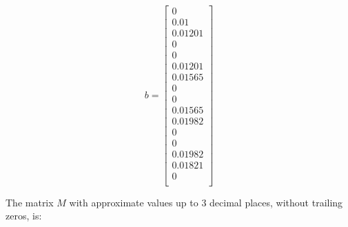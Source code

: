 \documentclass{article}
\begin{document}
\[
    b = \begin{bmatrix}
        0       \\
        0.01    \\
        0.01201 \\
        0       \\
        0       \\
        0.01201 \\
        0.01565 \\
        0       \\
        0       \\
        0.01565 \\
        0.01982 \\
        0       \\
        0       \\
        0.01982 \\
        0.01821 \\
        0       \\
    \end{bmatrix}
\]

The matrix \( M \) with approximate values up to 3 decimal places, without trailing zeros, is:
\end{document}
